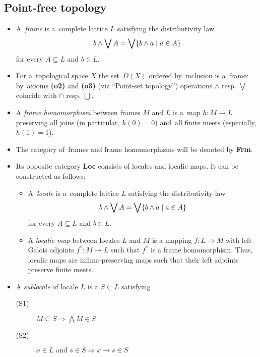 \subsection*{Point-free topology}

\begin{itemize}
\item A~\emph{frame} is a~complete lattice $L$ satisfying the distributivity
law
\[
  b \wedge \bigvee A = \bigvee \{ b \wedge a \mid a\in A \}
\]
for every $A\subseteq L$ and $b\in L$.

\item For a~topological space $X$ the set~$\Omega(X)$ ordered by~inclusion is
a~frame:
by~axioms {\bf (o2)} and {\bf (o3)} (viz ``Point-set topology'') operations
$\wedge$ resp. $\bigvee$ coincide with $\cap$ resp. $\bigcup$.

\item A \emph{frame homomorphism} between frames $M$ and $L$ is a~map $h\colon
M \to L$ preserving all joins (in particular, $h(0) = 0$) and~all finite meets
(especially, $h(1) = 1$).

\item The category of~frames and frame homomorphisms will be denoted by {\bf
Frm}.

\item Its opposite category {\bf Loc} consists of locales and localic maps.
It can be constructed as follows:

  \begin{itemize}
  \item A~\emph{locale} is a~complete lattice $L$ satisfying the distributivity
  law
  \[
    b \wedge \bigvee A = \bigvee \{ b \wedge a \mid a\in A \}
  \]
  for every $A\subseteq L$ and $b\in L$.

  \item A \emph{localic map} between locales $L$ and $M$ is a mapping $f\colon L
  \to M$ with left Galois adjoints $f^*\colon M \to L$ such that $f^*$ is a frame
  homomorphism.
  Thus, localic maps are infima-preserving maps such that their left adjoints
  preserve finite meets.
  \end{itemize}

\item A \emph{sublocale} of locale $L$ is a $S\subseteq L$ satisfying
  \begin{description}
  \item[(S1)] $M\subseteq S \Longrightarrow \bigwedge M\in S$
  \item[(S2)] $x\in L \text{ and } s\in S \Longrightarrow x \rightarrow s \in S$ 
  \end{description}
\end{itemize}

